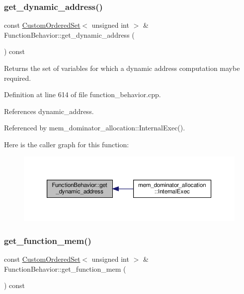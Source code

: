 \subsubsection{\texorpdfstring{get\+\_\+dynamic\+\_\+address()}{get\_dynamic\_address()}}
{\footnotesize\ttfamily const \hyperlink{classCustomOrderedSet}{Custom\+Ordered\+Set}$<$ unsigned int $>$ \& Function\+Behavior\+::get\+\_\+dynamic\+\_\+address (\begin{DoxyParamCaption}{ }\end{DoxyParamCaption}) const}



Returns the set of variables for which a dynamic address computation maybe required. 



Definition at line 614 of file function\+\_\+behavior.\+cpp.



References dynamic\+\_\+address.



Referenced by mem\+\_\+dominator\+\_\+allocation\+::\+Internal\+Exec().

Here is the caller graph for this function\+:
\nopagebreak
\begin{figure}[H]
\begin{center}
\leavevmode
\includegraphics[width=350pt]{d9/d45/classFunctionBehavior_a47651145548f49e5609bb5bc90cb318e_icgraph}
\end{center}
\end{figure}
\mbox{\label{classFunctionBehavior_a8fc387658e865ef562a851f0d4e95b98}} 
\subsubsection{\texorpdfstring{get\+\_\+function\+\_\+mem()}{get\_function\_mem()}}
{\footnotesize\ttfamily const \hyperlink{classCustomOrderedSet}{Custom\+Ordered\+Set}$<$ unsigned int $>$ \& Function\+Behavior\+::get\+\_\+function\+\_\+mem (\begin{DoxyParamCaption}{ }\end{DoxyParamCaption}) const}



